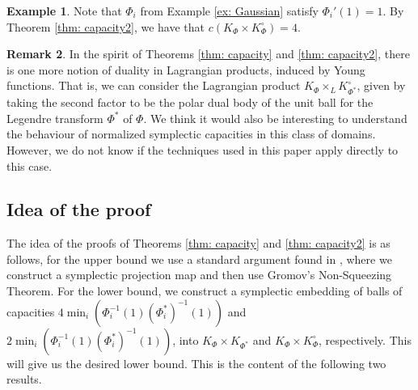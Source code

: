 \documentclass{article}
\newtheorem{theorem}{Theorem}[section]
\theoremstyle{definition}
\newtheorem{example}[theorem]{Example}
\newtheorem{remark}[theorem]{Remark}
\begin{document}
\begin{example}
Note that $\Phi_i$ from Example \ref{ex: Gaussian} satisfy $\Phi_i'(1)=1$. By Theorem \ref{thm: capacity2}, we have that  $c(K_{\Phi}\times K_{\Phi}^{\circ})=4$. 
\end{example}

\begin{remark}
In the spirit of Theorems \ref{thm: capacity} and \ref{thm: capacity2}, there is one more notion of duality in Lagrangian products, induced by Young functions. That is, we can consider the Lagrangian product $K_{\Phi}\times_LK_{\Phi^*}^{\circ}$, given by taking the second factor to be the polar dual body of the unit ball for the Legendre transform $\Phi^*$ of $\Phi$. We think it would also be interesting to understand the behaviour of normalized symplectic capacities in this class of domains. However, we do not know if the techniques used in this paper apply directly to this case.
\end{remark}





\subsection{Idea of the proof}

The idea of the proofs of Theorems \ref{thm: capacity} and \ref{thm: capacity2} is as follows, for the upper bound we use a standard argument found in \citep{ArtsteinAvidan2013FromSM}, where we construct a symplectic projection map and then use Gromov's Non-Squeezing Theorem. For the lower bound, we construct a symplectic embedding of balls of capacities $4\min_i(\Phi_i^{-1}(1){(\Phi^*_i)}^{-1}(1))$ and $2\min_i(\Phi_i^{-1}(1){(\Phi^*_i)}^{-1}(1))$, into $K_{\Phi}\times K_{\Phi^*}$ and $K_{\Phi}\times K_{\Phi}^{\circ}$, respectively. This will give us the desired lower bound. This is the content of the following two results.
\end{document}

